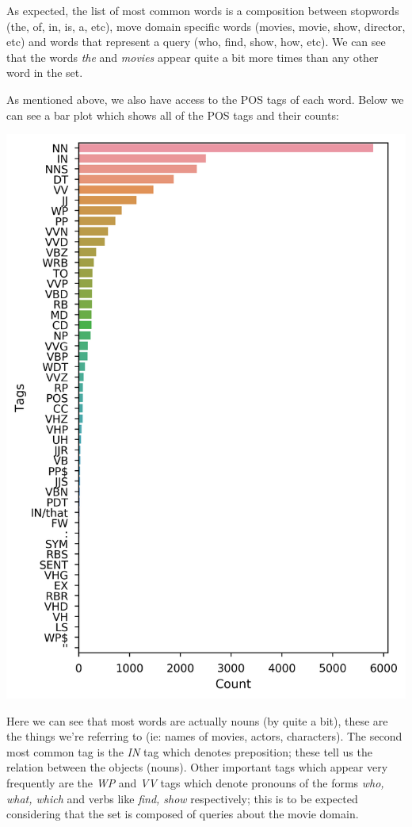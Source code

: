 \documentclass[11pt,a4paper]{article}
\begin{document}
	As expected, the list of most common words is a composition between stopwords (the, of, in, is, a, etc), move domain specific words (movies, movie, show, director, etc) and words that represent a query (who, find, show, how, etc). We can see that the words \textit{the} and \textit{movies} appear quite a bit more times than any other word in the set.
	
	As mentioned above, we also have access to the POS tags of each word. Below we can see a bar plot which shows all of the POS tags and their counts:

	\hspace*{-0.7cm}\includegraphics[scale=0.6]{barplot_pos_counts}
	
	Here we can see that most words are actually nouns (by quite a bit), these are the things we're referring to (ie: names of movies, actors, characters). The second most common tag is the \textit{IN} tag which denotes preposition; these tell us the relation between the objects (nouns). Other important tags which appear very frequently are the \textit{WP} and \textit{VV} tags which denote pronouns of the forms \textit{who, what, which} and verbs like \textit{find, show} respectively; this is to be expected considering that the set is composed of queries about the movie domain.
\end{document}
